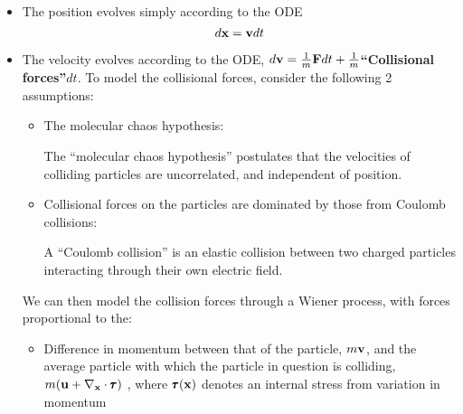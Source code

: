     \begin{itemize}
        \item  The position evolves simply according to the ODE
        \begin{equation}\label{velocity ODE}
            d\mathbf{x}  =  \mathbf{v} dt
        \end{equation}
        \item  The velocity evolves according to the ODE, $d\mathbf{v}  =  \frac{1}{m}\mathbf{F} dt + \frac{1}{m}${\bf ``Collisional forces''}$dt$.  To model the collisional forces, consider the following 2 assumptions:
        \begin{itemize}
            \item  The molecular chaos hypothesis:
            \begin{definition}
                The ``molecular chaos hypothesis'' postulates that the velocities of colliding particles are uncorrelated, and independent of position. \BA{[Ref]} 
            \end{definition}
            \item  Collisional forces on the particles are dominated by those from Coulomb collisions: 
            \begin{definition}
                A ``Coulomb collision'' is an elastic collision between two charged particles interacting through their own electric field. \BA{[Ref]} 
            \end{definition}
        \end{itemize}
        We can then model the collision forces through a Wiener process, with forces proportional to the:  
        \begin{itemize}
            \item  Difference in momentum between that of the particle, $m\mathbf{v}$, and the average particle with which the particle in question is colliding, $m(\mathbf{u} + \nabla_{\mathbf{x}}\cdot\pmb{\mathsf{\tau}})$ , where $\pmb{\mathsf{\tau}}(\mathbf{x})$ denotes an internal stress from variation in momentum   

\end{itemize}
\end{itemize}
